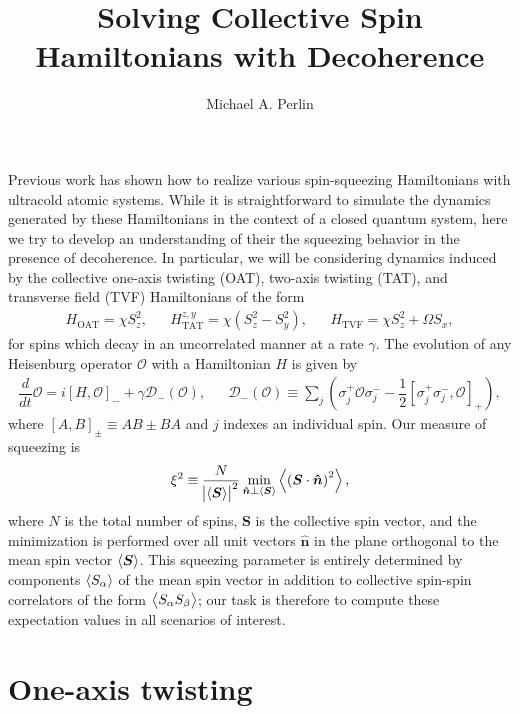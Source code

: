 \documentclass[aps,notitlepage,nofootinbib,11pt]{revtex4-1}
\renewcommand{\t}{\text} %
\newcommand{\f}[2]{\dfrac{#1}{#2}} %
\newcommand{\p}[1]{\left(#1\right)} %
\renewcommand{\sp}[1]{\left[#1\right]} %
\renewcommand{\v}{\bm} %
\newcommand{\uv}[1]{\v{\hat{#1}}} %
\renewcommand{\c}{\cdot} %
\newcommand{\bk}{\Braket} %
\newcommand{\D}{\mathcal{D}}
\renewcommand{\O}{\mathcal{O}}
\newcommand{\1}{\mathds{1}}
\begin{document}
\title{Solving Collective Spin Hamiltonians with Decoherence}

\author{Michael A. Perlin}

\maketitle

Previous work has shown how to realize various spin-squeezing
Hamiltonians with ultracold atomic systems.  While it is
straightforward to simulate the dynamics generated by these
Hamiltonians in the context of a closed quantum system, here we try to
develop an understanding of their the squeezing behavior in the
presence of decoherence.  In particular, we will be considering
dynamics induced by the collective one-axis twisting (OAT), two-axis
twisting (TAT), and transverse field (TVF) Hamiltonians of the form
\begin{align}
  H_{\t{OAT}} = \chi S_z^2,
  &&
  H_{\t{TAT}}^{z,y} = \chi \p{S_z^2 - S_y^2},
  &&
  H_{\t{TVF}} = \chi S_z^2 + \Omega S_x,
\end{align}
for spins which decay in an uncorrelated manner at a rate $\gamma$.
The evolution of any Heisenburg operator $\O$ with a Hamiltonian $H$
is given by
\begin{align}
  \f{d}{dt} \O
  = i\sp{H,\O}_- + \gamma\D_-\p{\O},
  &&
  \D_-\p{\O} \equiv \sum_j\p{\sigma_j^+\O\sigma_j^-
    - \f12\sp{\sigma_j^+\sigma_j^-,\O}_+},
  \label{eq:EOM}
\end{align}
where $\sp{A,B}_\pm\equiv AB\pm BA$ and $j$ indexes an individual
spin.  Our measure of squeezing is
\begin{align}
  \xi^2 \equiv \f{N}{\abs{\bk{\v S}}^2}
  \min_{\uv n\perp\bk{\v S}} \bk{\p{\v S\c\uv n}^2},
  \label{eq:squeezing}
\end{align}
where $N$ is the total number of spins, $\v S$ is the collective spin
vector, and the minimization is performed over all unit vectors
$\uv n$ in the plane orthogonal to the mean spin vector $\bk{\v S}$.
This squeezing parameter is entirely determined by components
$\bk{S_\alpha}$ of the mean spin vector in addition to collective
spin-spin correlators of the form $\bk{S_\alpha S_\beta}$; our task is
therefore to compute these expectation values in all scenarios of
interest.


\section{One-axis twisting}
\end{document}
